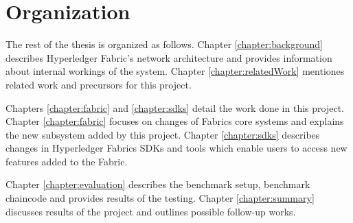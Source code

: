 \section{Organization} \label{sec:organization}
 The rest of the thesis is organized as follows. Chapter \ref{chapter:background} describes Hyperledger Fabric's network architecture and provides information about internal workings of the system. Chapter \ref{chapter:relatedWork} mentiones related work and precursors for this project.

 Chapters \ref{chapter:fabric} and \ref{chapter:sdks} detail the work done in this project. Chapter \ref{chapter:fabric} focuses on changes of Fabrics core systems and explains the new subsystem added by this project.
 Chapter \ref{chapter:sdks} describes changes in Hyperledger Fabrics SDKs and tools which enable users to access new features added to the Fabric.

 Chapter \ref{chapter:evaluation} describes the benchmark setup, benchmark chaincode and provides results of the testing. Chapter \ref{chapter:summary} discusses results of the project and outlines possible follow-up works.
